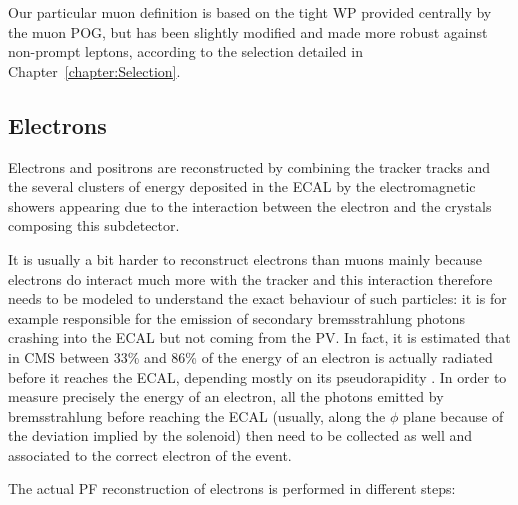 \documentclass[a4paper, 10pt, openright]{report}
\begin{document}
Our particular muon definition is based on the tight \ac{WP} provided centrally by the muon \ac{POG}, but has been slightly modified and made more robust against non-prompt leptons, according to the selection detailed in Chapter~\ref{chapter:Selection}.

\subsection{Electrons} \label{subsection:Electrons}

Electrons and positrons are reconstructed by combining the tracker tracks and the several clusters of energy deposited in the \ac{ECAL} by the electromagnetic showers appearing due to the interaction between the electron and the crystals composing this subdetector. 

It is usually a bit harder to reconstruct electrons than muons mainly because electrons do interact much more with the tracker and this interaction therefore needs to be modeled to understand the exact behaviour of such particles: it is for example responsible for the emission of secondary bremsstrahlung photons crashing into the \ac{ECAL} but not coming from the \ac{PV}. In fact, it is estimated that in \ac{CMS} between 33\% and 86\% of the energy of an electron is actually radiated before it reaches the \ac{ECAL}, depending mostly on its pseudorapidity \cite{EleReco}. In order to measure precisely the energy of an electron, all the photons emitted by bremsstrahlung before reaching the \ac{ECAL} (usually, along the $\phi$ plane because of the deviation implied by the solenoid) then need to be collected as well and associated to the correct electron of the event.

The actual \ac{PF} reconstruction of electrons is performed in different steps:
\end{document}
